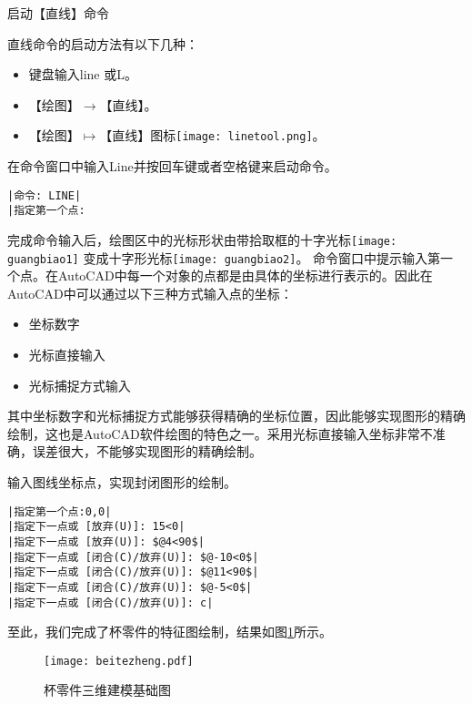 \begin{procedure}
\item 启动【直线】命令

直线命令的启动方法有以下几种：
\begin{itemize}
\item 键盘输入line 或L。
\item 【绘图】$\rightarrow$【直线】。
\item 【绘图】$\mapsto$【直线】图标\texttt{[image: linetool.png]}。
\end{itemize}
在命令窗口中输入Line并按回车键或者空格键来启动命令。
\begin{lstlisting}
|命令: LINE|
|指定第一个点:
\end{lstlisting}
完成命令输入后，绘图区中的光标形状由带拾取框的十字光标\texttt{[image: guangbiao1]} 变成十字形光标\texttt{[image: guangbiao2]}。
命令窗口中提示输入第一个点。在AutoCAD中每一个对象的点都是由具体的坐标进行表示的。因此在AutoCAD中可以通过以下三种方式输入点的坐标：
\begin{itemize}
\item 坐标数字
\item 光标直接输入
\item 光标捕捉方式输入
\end{itemize}

其中坐标数字和光标捕捉方式能够获得精确的坐标位置，因此能够实现图形的精确绘制，这也是AutoCAD软件绘图的特色之一。采用光标直接输入坐标非常不准确，误差很大，不能够实现图形的精确绘制。
\item 输入图线坐标点，实现封闭图形的绘制。

\begin{lstlisting}
|指定第一个点:0,0|
|指定下一点或 [放弃(U)]: 15<0|
|指定下一点或 [放弃(U)]: $@4<90$|
|指定下一点或 [闭合(C)/放弃(U)]: $@-10<0$|
|指定下一点或 [闭合(C)/放弃(U)]: $@11<90$|
|指定下一点或 [闭合(C)/放弃(U)]: $@-5<0$|
|指定下一点或 [闭合(C)/放弃(U)]: c|
\end{lstlisting}

至此，我们完成了杯零件的特征图绘制，结果如图\ref{fig:bettezheng}所示。
\noindent
\begin{figure}[htbp]
\centering
\texttt{[image: beitezheng.pdf]}
\caption{杯零件三维建模基础图}\label{fig:bettezheng}
\end{figure}
\end{procedure}

